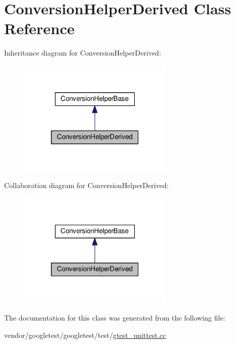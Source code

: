 \hypertarget{classConversionHelperDerived}{}\section{Conversion\+Helper\+Derived Class Reference}
\label{classConversionHelperDerived}


Inheritance diagram for Conversion\+Helper\+Derived\+:\nopagebreak
\begin{figure}[H]
\begin{center}
\leavevmode
\includegraphics[width=208pt]{classConversionHelperDerived__inherit__graph}
\end{center}
\end{figure}


Collaboration diagram for Conversion\+Helper\+Derived\+:\nopagebreak
\begin{figure}[H]
\begin{center}
\leavevmode
\includegraphics[width=208pt]{classConversionHelperDerived__coll__graph}
\end{center}
\end{figure}


The documentation for this class was generated from the following file\+:\begin{DoxyCompactItemize}
\item 
vendor/googletest/googletest/test/\hyperlink{gtest__unittest_8cc}{gtest\+\_\+unittest.\+cc}\end{DoxyCompactItemize}
